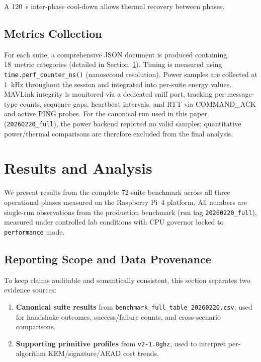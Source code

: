 \documentclass[conference]{IEEEtran}
\begin{document}
A \SI{120}{\second} inter-phase cool-down allows thermal recovery between phases.

\subsection{Metrics Collection}

For each suite, a comprehensive JSON document is produced containing 18~metric categories (detailed in Section~\ref{sec:results}).
Timing is measured using \texttt{time.perf\_counter\_ns()} (nanosecond resolution).
Power samples are collected at \SI{1}{\kilo\hertz} throughout the session and integrated into per-suite energy values.
MAVLink integrity is monitored via a dedicated sniff port, tracking per-message-type counts, sequence gaps, heartbeat intervals, and RTT via COMMAND\_ACK and active PING probes.
For the canonical run used in this paper (\texttt{20260220\_full}), the power backend reported no valid samples; quantitative power/thermal comparisons are therefore excluded from the final analysis.

\FloatBarrier
\section{Results and Analysis}
\label{sec:results}

We present results from the complete 72-suite benchmark across all three operational phases measured on the Raspberry Pi~4 platform.
All numbers are single-run observations from the production benchmark (run tag \texttt{20260220\_full}), measured under controlled lab conditions with CPU governor locked to \texttt{performance} mode.

\subsection{Reporting Scope and Data Provenance}

To keep claims auditable and semantically consistent, this section separates two evidence sources:
\begin{enumerate}[label=\textbf{R\arabic*}, leftmargin=2em]
    \item \textbf{Canonical suite results} from \texttt{benchmark\_full\_table\_20260220.csv}, used for handshake outcomes, success/failure counts, and cross-scenario comparisons.
    \item \textbf{Supporting primitive profiles} from \texttt{v2-1.8ghz}, used to interpret per-algorithm KEM/signature/AEAD cost trends.
\end{enumerate}
\end{document}
